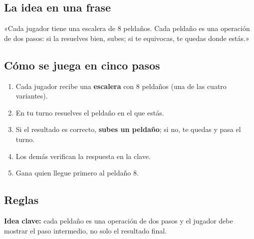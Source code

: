 \documentclass[12pt, letterpaper]{article}
\begin{document}
\subsection{La idea en una frase}

\begin{cuadroextra}
  «Cada jugador tiene una escalera de 8 peldaños. Cada peldaño es una operación de dos pasos: si la resuelves bien, subes; si te equivocas, te quedas donde estás.»
\end{cuadroextra}

\subsection{Cómo se juega en cinco pasos}

\begin{enumerate}[leftmargin=*]
  \item Cada jugador recibe una \textbf{escalera} con 8 peldaños (una de las cuatro variantes).
  \item En tu turno resuelves el peldaño en el que estás.
  \item Si el resultado es correcto, \textbf{subes un peldaño}; si no, te quedas y pasa el turno.
  \item Los demás verifican la respuesta en la clave.
  \item Gana quien llegue primero al peldaño 8.
\end{enumerate}

\subsection{Reglas}

\textbf{Idea clave:} cada peldaño es una operación de dos pasos y el jugador debe mostrar el paso intermedio, no solo el resultado final.
\end{document}
